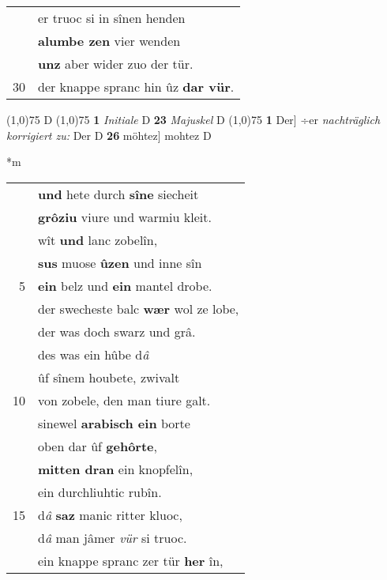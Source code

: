 \documentclass[8pt,a4paper,notitlepage]{article}
\begin{document}
\begin{table}[ht]
\begin{minipage}[t]{0.5\linewidth}
\begin{tabular}{rl}
 & er truoc si in sînen henden\\ 
 & \textbf{alumbe zen} vier wenden\\ 
 & \textbf{unz} aber wider zuo der tür.\\ 
30 & der knappe spranc hin ûz \textbf{dar vür}.\\ 
\end{tabular}
\scriptsize
\line(1,0){75} \newline
D \newline
\line(1,0){75} \newline
\textbf{1} \textit{Initiale} D  \textbf{23} \textit{Majuskel} D  \newline
\line(1,0){75} \newline
\textbf{1} Der] ÷er \textit{nachträglich korrigiert zu:} Der D \textbf{26} möhtez] mohtez D \newline
\end{minipage}
\hspace{0.5cm}
\begin{minipage}[t]{0.5\linewidth}
\small
\begin{center}*m
\end{center}
\begin{tabular}{rl}
 & \textbf{und} hete durch \textbf{sîne} siecheit\\ 
 & \textbf{grôziu} viure und warmiu kleit.\\ 
 & wît \textbf{und} lanc zobelîn,\\ 
 & \textbf{sus} muose \textbf{ûzen} und inne sîn\\ 
5 & \textbf{ein} belz und \textbf{ein} mantel drobe.\\ 
 & der swecheste balc \textbf{wær} wol ze lobe,\\ 
 & der was doch swarz und grâ.\\ 
 & des was ein hûbe d\textit{â}\\ 
 & ûf sînem houbete, zwivalt\\ 
10 & von zobele, den man tiure galt.\\ 
 & sinewel \textbf{arabisch ein} borte\\ 
 & oben dar ûf \textbf{gehôrte},\\ 
 & \textbf{mitten dran} ein knopfelîn,\\ 
 & ein durchliuhtic rubîn.\\ 
15 & d\textit{â} \textbf{saz} manic ritter kluoc,\\ 
 & d\textit{â} man jâmer \textit{vür} si truoc.\\ 
 & ein knappe spranc zer tür \textbf{her} în,\\ 

\end{tabular}
\end{minipage}
\end{table}
\end{document}
